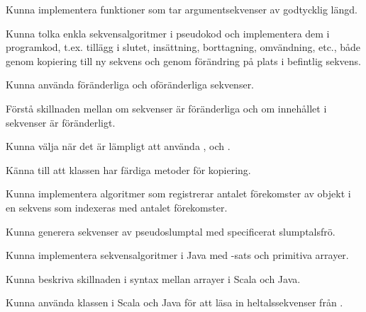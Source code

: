 
\item Kunna implementera funktioner som tar argumentsekvenser av godtycklig längd.
\item Kunna tolka enkla sekvensalgoritmer i pseudokod och implementera dem i programkod, t.ex. tillägg i slutet, insättning, borttagning, omvändning, etc., både genom kopiering till ny sekvens och genom förändring på plats i befintlig sekvens.  
\item Kunna använda föränderliga och oföränderliga sekvenser.
\item Förstå skillnaden mellan om sekvenser är föränderliga och om innehållet i sekvenser är föränderligt.
\item Kunna välja när det är lämpligt att använda ,  och .
\item Känna till att klassen  har färdiga metoder för kopiering.
\item Kunna implementera algoritmer som registrerar antalet förekomster av objekt i en sekvens som indexeras med antalet förekomster.
\item Kunna generera sekvenser av pseudoslumptal med specificerat slumptalsfrö. 
\item Kunna implementera sekvensalgoritmer i Java med -sats och primitiva arrayer. 
\item Kunna beskriva skillnaden i syntax mellan arrayer i Scala och Java.
\item Kunna använda klassen  i Scala och Java för att läsa in heltalssekvenser från . 

